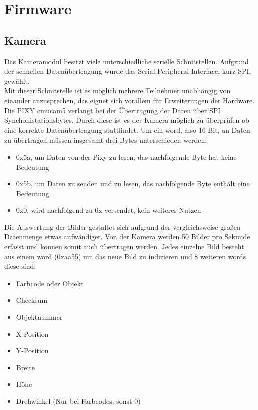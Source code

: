 \chapter{Firmware}

\renewcommand{\kapitelautor}{Autor: Lucas Ullrich}

\section{Kamera}\label{Sec. Kamera}
Das Kameramodul besitzt viele unterschiedliche serielle Schnitstellen. Aufgrund der schnellen Datenübertragung wurde das Serial Peripheral Interface, kurz SPI, gewählt.\\
Mit dieser Schnitstelle ist es möglich mehrere Teilnehmer unabhängig von einander anzusprechen, das eignet sich vorallem für Erweiterungen der Hardware.\\
Die PIXY cmucam5 verlangt bei der Übertragung der Daten über SPI Synchonistationsbytes. Durch diese ist es der Kamera möglich zu überprüfen ob eine korrekte Datenübertragung stattfindet. Um ein word, also 16 Bit, an Daten zu übertragen müssen insgesamt drei Bytes unterschieden werden:
\begin{itemize}
\item 0x5a, um Daten von der Pixy zu lesen, das nachfolgende Byte hat keine Bedeutung
\item 0x5b, um Daten zu senden und zu lesen, das nachfolgende Byte enthält eine Bedeutung
\item 0x0, wird nachfolgend zu 0x versendet, kein weiterer Nutzen
\end{itemize}

Die Auswertung der Bilder gestaltet sich aufgrund der vergleichsweise großen Datenmenge etwas aufwändiger. Von der Kamera werden 50 Bilder pro Sekunde erfasst und können somit auch übertragen werden. Jedes einzelne Bild besteht aus einem word (0xaa55) um das neue Bild zu indizieren und 8 weiteren words, diese sind:
\begin{itemize}
\item Farbcode oder Objekt
\item Checksum
\item Objektnummer
\item X-Position
\item Y-Position
\item Breite
\item Höhe
\item Drehwinkel (Nur bei Farbcodes, sonst 0)
\end{itemize}

